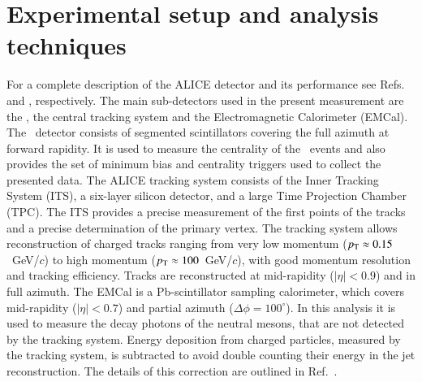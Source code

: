 \documentclass[3p,times]{simplearticle}
\begin{document}
\section{Experimental setup and analysis techniques}
\label{sec:analysis}
For a complete description of the ALICE detector and its performance see Refs.~\cite{ALICE:2008} and \cite{ALICE:2014b}, respectively.
%
The main sub-detectors used in the present measurement are the \VZERO, the central tracking system and the Electromagnetic Calorimeter (EMCal).
%
The \VZERO\ detector consists of segmented scintillators covering the full azimuth at forward rapidity.
It is used to measure the centrality of the \PbPb\ events and also provides the set of minimum bias and centrality
triggers used to collect the presented data.
%
The ALICE tracking system consists of the Inner Tracking System (ITS), a six-layer silicon detector, and a large Time Projection Chamber (TPC).
The ITS provides a precise measurement of the first points of the tracks
and a precise determination of the primary vertex. The tracking system allows reconstruction of charged tracks ranging from very low momentum 
($p_{\mathrm{T}}\approx 0.15$~GeV/$c$) to high momentum ($p_{\mathrm{T}}\approx 100$~GeV/$c$), with good momentum resolution and tracking efficiency.
Tracks are reconstructed at mid-rapidity ($|\eta|<0.9$) and in full azimuth.
The EMCal is a Pb-scintillator sampling calorimeter, which covers mid-rapidity
($|\eta|<0.7$) and partial azimuth ($\Delta\phi=100^{\circ}$). In this analysis it is used
to measure the decay photons of the neutral mesons, that are not detected by the tracking system. Energy deposition
from charged particles, measured by the tracking system, is subtracted to avoid double counting their energy
in the jet reconstruction. The details of this correction are outlined in Ref.~\cite{ALICE:2014b}.
\end{document}
